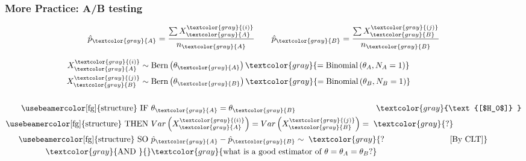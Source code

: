 \documentclass[xcolor={dvipsnames}]{beamer}
\begin{document}
\frame
{
\frametitle{More Practice: A/B testing}

$$\hat p_{\textcolor{gray}{A}} = \frac{\sum X_{\textcolor{gray}{A}}^{\textcolor{gray}{(i)}}}{n_{\textcolor{gray}{A}}} \quad \quad \hat p_{\textcolor{gray}{B}} = \frac{\sum X_{\textcolor{gray}{B}}^{\textcolor{gray}{(j)}}}{n_{\textcolor{gray}{B}}}$$

\begin{align*} 
   X_{\textcolor{gray}{A}}^{\textcolor{gray}{(i)}} \sim {}& \text{Bern}\left(\theta_{\textcolor{gray}{A}}\right) \textcolor{gray}{= \text{Binomial}\left(\theta_A,N_A=1\right)} \\
   X_{\textcolor{gray}{B}}^{\textcolor{gray}{(j)}} \sim {}& \text{Bern}\left(\theta_{\textcolor{gray}{B}}\right) \textcolor{gray}{= \text{Binomial}\left(\theta_B,N_B=1\right)} \\
   \\
   {\text{\usebeamercolor[fg]{structure} IF }} {}& \theta_{\textcolor{gray}{A}} = \theta_{\textcolor{gray}{B}} \quad\quad\quad\quad\quad\quad\quad\quad\quad\;\;\; \textcolor{gray}{\text{[$H_0$]} } \\
   {\text{\usebeamercolor[fg]{structure} THEN }} {}& Var\left(X_{\textcolor{gray}{A}}^{\textcolor{gray}{(i)}}\right) = Var\left(X_{\textcolor{gray}{B}}^{\textcolor{gray}{(j)}}\right) = \;\textcolor{gray}{?} \\ 
   {\text{\usebeamercolor[fg]{structure} SO } } {}& \hat p_{\textcolor{gray}{A}} - \hat p_{\textcolor{gray}{B}} \sim \; \textcolor{gray}{? \quad\quad\quad\quad\quad\quad\quad\quad \text{[By CLT]} } \\
   \textcolor{gray}{\text{AND } } {}&  \textcolor{gray}{\text{what is a good estimator of } \theta = \theta_A = \theta_B? } \\
\end{align*}
}

\end{document}
